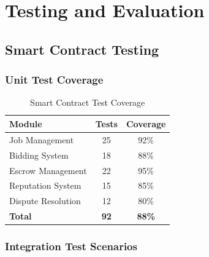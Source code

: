 \documentclass[a4paper,13pt,twoside]{report}
\theoremstyle{definition}
\begin{document}
\section{Testing and Evaluation}

\subsection{Smart Contract Testing}

\subsubsection{Unit Test Coverage}

\begin{table}[h]
\centering
\caption{Smart Contract Test Coverage}
\begin{tabular}{|l|c|c|}
\hline
\textbf{Module} & \textbf{Tests} & \textbf{Coverage} \\
\hline
Job Management & 25 & 92\% \\
Bidding System & 18 & 88\% \\
Escrow Management & 22 & 95\% \\
Reputation System & 15 & 85\% \\
Dispute Resolution & 12 & 80\% \\
\hline
\textbf{Total} & \textbf{92} & \textbf{88\%} \\
\hline
\end{tabular}
\end{table}

\subsubsection{Integration Test Scenarios}
\end{document}
